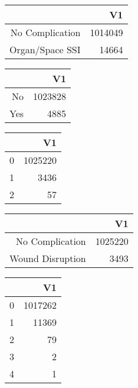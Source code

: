 \bigskip\bigskip
\centering
\begin{tabular}{rr}
  \hline
 & V1 \\ 
  \hline
No Complication & 1014049 \\ 
  Organ/Space SSI & 14664 \\ 
   \hline
\end{tabular}

\bigskip\bigskip
\centering
\begin{tabular}{rr}
  \hline
 & V1 \\ 
  \hline
No & 1023828 \\ 
  Yes & 4885 \\ 
   \hline
\end{tabular}

\bigskip\bigskip
\centering
\begin{tabular}{rr}
  \hline
 & V1 \\ 
  \hline
0 & 1025220 \\ 
  1 & 3436 \\ 
  2 &  57 \\ 
   \hline
\end{tabular}

\bigskip\bigskip
\centering
\begin{tabular}{rr}
  \hline
 & V1 \\ 
  \hline
No Complication & 1025220 \\ 
  Wound Disruption & 3493 \\ 
   \hline
\end{tabular}

\bigskip\bigskip
\centering
\begin{tabular}{rr}
  \hline
 & V1 \\ 
  \hline
0 & 1017262 \\ 
  1 & 11369 \\ 
  2 &  79 \\ 
  3 &   2 \\ 
  4 &   1 \\ 
   \hline
\end{tabular}

